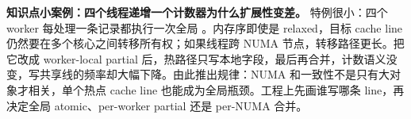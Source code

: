 \begin{casebox}
\textbf{知识点小案例：四个线程递增一个计数器为什么扩展性变差。}
特例很小：四个 worker 每处理一条记录都执行一次全局 。内存序即使是 relaxed，目标 cache line 仍然要在多个核心之间转移所有权；如果线程跨 NUMA 节点，转移路径更长。把它改成 worker-local partial 后，热路径只写本地字段，最后再合并，计数语义没变，写共享线的频率却大幅下降。由此推出规律：NUMA 和一致性不是只有大对象才相关，单个热点 cache line 也能成为全局瓶颈。工程上先画谁写哪条 line，再决定全局 atomic、per-worker partial 还是 per-NUMA 合并。
\end{casebox}
